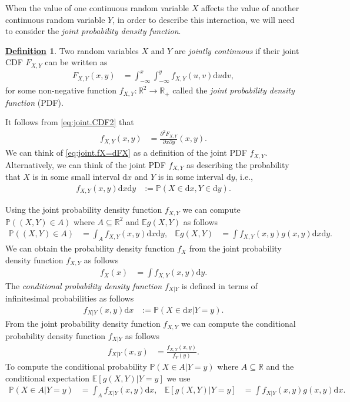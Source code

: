 \documentclass[12pt]{book}
\numberwithin{equation}{chapter}
\theoremstyle{plain}
\numberwithin{theorem}{section}
\theoremstyle{definition}
\newtheorem{definition}[theorem]{\underline{Definition}}
\numberwithin{exercise}{chapter}
\newcommand{\<}{\langle}
\renewcommand{\>}{\rangle}
\renewcommand{\(}{\left(}
\renewcommand{\)}{\right)}
\renewcommand{\[}{\left[}
\renewcommand{\]}{\right]}
\newcommand\Eb{\mathds{E}}
\newcommand\Pb{\mathds{P}}
\newcommand\Rb{\mathds{R}}
\renewcommand\d{\partial}
\newcommand\dd{\mathrm{d}}
\theoremstyle{definition}
\numberwithin{question}{section}
\begin{document}
\noindent
When the value of one continuous random variable $X$ affects the value of another continuous random variable $Y$, in order to describe this interaction, we will need to consider the \textit{joint probability density function}.

\begin{definition}
\label{def:joint.cont.rv}
Two random variables $X$ and $Y$ are \textit{jointly continuous} if their joint CDF $F_{X,Y}$ can be written as
\begin{align}
F_{X,Y}(x,y)
	&=	\int_{-\infty}^x \int_{-\infty}^y f_{X,Y}(u,v) \dd u \dd v, \label{eq:joint.CDF2}
\end{align}
for some non-negative function $f_{X,Y} : \Rb^2 \to \Rb_+$ called the \textit{joint probability density function} (PDF).
\end{definition}

\noindent
It follows from \eqref{eq:joint.CDF2} that
\begin{align}
f_{X,Y}(x,y)
	&=	\frac{\d^2 F_{X,Y}}{\d x \d y}(x,y) . \label{eq:joint.fX=dFX}
\end{align}
We can think of \eqref{eq:joint.fX=dFX} as a definition of the joint PDF $f_{X,Y}$.  Alternatively, we can think of the joint PDF $f_{X,Y}$ as describing the probability that $X$ is in some small interval $\dd x$ and $Y$ is in some interval $\dd y$, i.e.,
\begin{align}
f_{X,Y}(x,y) \dd x \dd y
	&:=	\Pb( X \in \dd x , Y \in \dd y) . \label{eq:joint.pdf}
\end{align}

\noindent
Using the joint probability density function $f_{X,Y}$ we can compute $\Pb((X,Y) \in A)$ where $A \subseteq \Rb^2$ and $\Eb g(X,Y)$ as follows
\begin{align}
\Pb( (X,Y) \in A)
	&=	\int_A f_{X,Y}(x,y) \dd x \dd y, &
\Eb g(X,Y)
	&=	\int f_{X,Y}(x,y) g(x,y) \dd x \dd y .
\end{align}
We can obtain the probability density function $f_X$ from the joint probability density function $f_{X,Y}$ as follows
\begin{align}
f_X(x)
	&=	\int f_{X,Y}(x,y) \dd y .
\end{align}
The \textit{conditional probability density function} $f_{X|Y}$ is defined in terms of infinitesimal probabilities as follows
\begin{align}
f_{X|Y}(x,y) \dd x
	&:= \Pb( X \in \dd x | Y = y ) .
\end{align}
From the joint probability density function $f_{X,Y}$ we can compute the conditional probability density function $f_{X|Y}$ as follows
\begin{align}
f_{X|Y}(x , y)
	&=	\frac{f_{X,Y}(x,y) }{ f_Y(y)} . \label{eq:fXgivenY2}
\end{align}
To compute the conditional probability $\Pb(X \in A | Y = y)$ where $A \subseteq \Rb$ and the conditional expectation $\Eb[ g(X,Y) | Y = y ]$ we use
\begin{align}
\Pb( X \in A | Y = y )
	&=	\int_A f_{X|Y}(x,y) \dd x, &
\Eb[ g(X, Y ) | Y = y ]
	&=	\int f_{X|Y}(x,y) g(x,y) \dd x. \label{eq:cond.cont}
\end{align}
\end{document}

